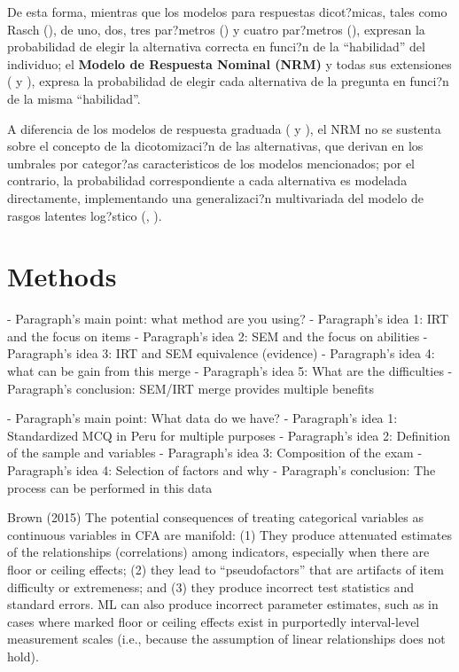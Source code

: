 De esta forma, mientras que los modelos para respuestas dicot?micas, tales como Rasch (\citealp{Rasch1980}), de uno, dos, tres par?metros (\citealp{Lord_Nov2008}) y cuatro par?metros (\citealp{McDonald1967}), expresan la probabilidad de elegir la alternativa correcta en funci?n de la ``habilidad'' del individuo; el \textbf{Modelo de Respuesta Nominal (NRM)} y todas sus extensiones (\citealt{Bock1972}  y \citealt[cap?tulo 2]{Linden1997}), expresa la probabilidad de elegir cada alternativa de la pregunta en funci?n de la misma ``habilidad''. 

A diferencia de los modelos de respuesta graduada (\citealt{Samejima1969, Samejima1972} y \citealt[cap?tulo 5]{Ham_Swam1991}), el NRM no se sustenta sobre el concepto de la dicotomizaci?n de las alternativas, que derivan en los umbrales por categor?as caracteristicos de los modelos mencionados; por el contrario, la probabilidad correspondiente a cada alternativa es modelada directamente, implementando una generalizaci?n multivariada del modelo de rasgos latentes log?stico (\citealt{Bock1972}, \citealt{Ostini2006}).


\section{Methods}

- Paragraph's main point: what method are you using?
- Paragraph's idea 1: IRT and the focus on items
- Paragraph's idea 2: SEM and the focus on abilities
- Paragraph's idea 3: IRT and SEM equivalence (evidence)
- Paragraph's idea 4: what can be gain from this merge
- Paragraph's idea 5: What are the difficulties
- Paragraph's conclusion: SEM/IRT merge provides multiple benefits

- Paragraph's main point: What data do we have?
- Paragraph's idea 1: Standardized MCQ in Peru for multiple purposes
- Paragraph's idea 2: Definition of the sample and variables
- Paragraph's idea 3: Composition of the exam
- Paragraph's idea 4: Selection of factors and why
- Paragraph's conclusion: The process can be performed in this data


Brown (2015)
The potential consequences of treating categorical variables as continuous variables in CFA are manifold: (1) They produce attenuated estimates of the relationships (correlations) among indicators, especially when there are floor or ceiling effects; (2) they lead to “pseudofactors” that are artifacts of item difficulty or extremeness; and (3) they produce incorrect test statistics and standard errors. ML can also produce  incorrect parameter estimates, such as in cases where marked floor or ceiling effects exist in purportedly interval-level measurement scales (i.e., because the assumption of linear relationships does not hold).

